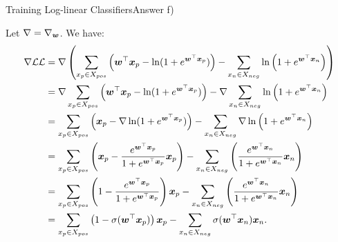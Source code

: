 \documentclass[t]{beamer}
\begin{document}
\begin{frame}{Training Log-linear Classifiers}{Answer f)}
    \begin{itemize}
        {\tiny
        \item Let $\nabla=\nabla_{{\boldsymbol{w}}}$. We have:
              \begin{align}
                  \nabla\mathcal{LL} & = \nabla \left(\sum_{x_p\in X_{pos}} \left({\boldsymbol{w}}^\top{\boldsymbol{x}}_p - \ln(1 + e^{{\boldsymbol{w}}^\top{\boldsymbol{x}}_p})\right) - \sum_{x_n\in X_{neg}}\ln\left(1 + e^{{\boldsymbol{w}}^\top{\boldsymbol{x}}_n}\right)\right)                           \\
                                 & = \nabla\sum_{x_p\in X_{pos}} \left({\boldsymbol{w}}^\top{\boldsymbol{x}}_p - \ln(1 + e^{{\boldsymbol{w}}^\top{\boldsymbol{x}}_p})\right) - \nabla\sum_{x_n\in X_{neg}}\ln\left(1 + e^{{\boldsymbol{w}}^\top{\boldsymbol{x}}_n}\right)                                   \\
                                 & = \sum_{x_p\in X_{pos}} \left({\boldsymbol{x}}_p - \nabla\ln(1 + e^{{\boldsymbol{w}}^\top{\boldsymbol{x}}_p})\right) - \sum_{x_n\in X_{neg}}\nabla\ln\left(1 + e^{{\boldsymbol{w}}^\top{\boldsymbol{x}}_n}\right)                                           \\
                                 & = \sum_{x_p\in X_{pos}} \left({\boldsymbol{x}}_p - \frac{e^{{\boldsymbol{w}}^\top{\boldsymbol{x}}_p}}{1 + e^{{\boldsymbol{w}}^\top{\boldsymbol{x}}_p}}{\boldsymbol{x}}_p\right) - \sum_{x_n\in X_{neg}}\left(\frac{e^{{\boldsymbol{w}}^\top{\boldsymbol{x}}_n}}{1 + e^{{\boldsymbol{w}}^\top{\boldsymbol{x}}_n}}{\boldsymbol{x}}_n\right) \\
                                 & = \sum_{x_p\in X_{pos}} \left(1 - \frac{e^{{\boldsymbol{w}}^\top{\boldsymbol{x}}_p}}{1 + e^{{\boldsymbol{w}}^\top{\boldsymbol{x}}_p}}\right){\boldsymbol{x}}_p - \sum_{x_n\in X_{neg}}\left(\frac{e^{{\boldsymbol{w}}^\top{\boldsymbol{x}}_n}}{1 + e^{{\boldsymbol{w}}^\top{\boldsymbol{x}}_n}}{\boldsymbol{x}}_n\right)     \\
                                 & = \sum_{x_p\in X_{pos}} \left(1 - \sigma({\boldsymbol{w}}^\top{\boldsymbol{x}}_p)\right){\boldsymbol{x}}_p - \sum_{x_n\in X_{neg}}\sigma({\boldsymbol{w}}^\top{\boldsymbol{x}}_n){\boldsymbol{x}}_n.
              \end{align}
              }
    \end{itemize}
\end{frame}
\end{document}
